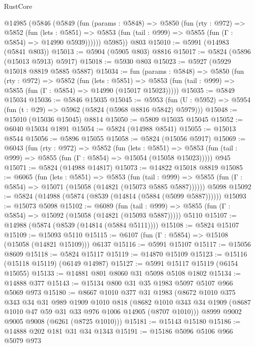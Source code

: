 \begin{lexlean}{RustCore}
\begin{coremodule}
    @14985
      (@5846
        (@5849
          (fun (params : @5848) =>
          @5850
            (fun (rty : @972) =>
            @5852
              (fun (lets : @5851) =>
              @5853 (fun (tail : @999) => @5855 (fun (Γ : @5854) => @14990 @5939))))))
        @5985))
    @803
@15010 := @5991 (@14983 (@5841 @803))
@15013 := @5904 (@5905 @803) @8816
@15017 := @5824 (@5896 (@15013 @5913) @5917)
@15018 := @5930 @803
@15023 := @5927 (@5929 @15018 @8819 @5885 @5887)
@15034 := fun (params : @5848) =>
  @5850
    (fun (rty : @972) =>
    @5852
      (fun (lets : @5851) =>
      @5853 (fun (tail : @999) => @5855 (fun (Γ : @5854) => @14990 (@15017 @15023)))))
@15035 := @5849 @15034
@15036 := @5846 @15035
@15045 := @5953
    (fun (U : @5952) => @5954 (fun (t : @29) => @5962 (@5824 (@5968 @8816 @5842) @5979)))
@15048 := @15010 (@15036 @15045) @8814
@15050 := @5809 @15035 @15045
@15052 := @6040 @15034 @1891
@15054 := @5824 (@14988 @8541)
@15055 := @15013 @8544
@15056 := @5896 @15055
@15058 := @5824 (@15056 @5917)
@15069 := @6043
    (fun (rty : @972) =>
    @5852
      (fun (lets : @5851) =>
      @5853 (fun (tail : @999) => @5855 (fun (Γ : @5854) => @15054 (@15058 @15023)))))
    @945
@15071 := @5824 (@14988 @14817)
@15073 := @14822 @15018 @8819
@15085 := @6065
    (fun (lets : @5851) =>
    @5853
      (fun (tail : @999) =>
      @5855 (fun (Γ : @5854) => @15071 (@15058 (@14821 (@15073 @5885 @5887))))))
    @5098
@15092 := @5824 (@14988 (@5874 (@8539 (@14814 (@5884 (@5099 @5887))))))
@15093 := @15073 @5098
@15102 := @6089
    (fun (tail : @999) => @5855 (fun (Γ : @5854) => @15092 (@15058 (@14821 (@15093 @5887)))))
    @5110
@15107 := @14988 (@5874 (@8539 (@14814 (@5884 @5111))))
@15108 := @5824 @15107
@15109 := @15093 @5110
@15115 := @6107 (fun (Γ : @5854) => @15108 (@15058 (@14821 @15109))) @6137
@15116 := @5991 @15107
@15117 := @15056 @8609
@15118 := @5824 @15117
@15119 := @14870 @15109
@15123 := @15116 (@15118 @15119) (@6149 @14987)
@15127 := @5991 @15117 @15119 (@6154 @15055)
@15133 := @14881 @801 @8060 @31 @5098 @5108 @1802
@15134 := @14888 @377
@15143 := @15134 @800 @31 @35 @1983 @5097 @5107 @966 @5069 @973
@15180 := @8667
    @1010
    @377
    @31
    @1983
    (@8672
      @1010
      @375
      @343
      @34
      @31
      @989
      @1909
      @1010
      @818
      (@8682 @1010 @343 @34 @1909 (@8687 @1010 @47 @59 @31 @33 @976 @1006 @14905 (@8707 @1010)))
      @8999
      @9002
      @9005
      @9008
      (@6261 (@8725 @1010)))
@15181 := @15143 @15180
@15186 := @14888 @202 @181 @31 @34 @1343
@15191 := @15186 @5096 @5106 @966 @5079 @973

\end{coremodule}
\end{lexlean}
